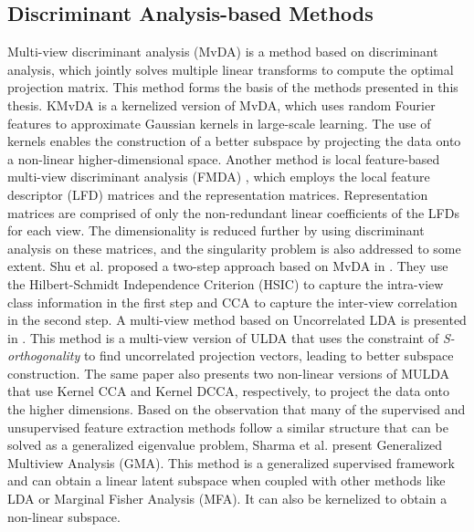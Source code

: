 \subsection{Discriminant Analysis-based Methods}
\label{subs:Lit_Mv_DA}
Multi-view discriminant analysis (MvDA) \cite{KanSZLC16} is a method based on discriminant analysis, which jointly solves multiple linear transforms to compute the optimal projection matrix. This method forms the basis of the methods presented in this thesis. KMvDA \cite{LiGL20} is a kernelized version of MvDA, which uses random Fourier features to approximate Gaussian kernels in large-scale learning. The use of kernels enables the construction of a better subspace by projecting the data onto a non-linear higher-dimensional space. Another method is local feature-based multi-view discriminant analysis (FMDA) \cite{HuPGZ18}, which employs the local feature descriptor (LFD) matrices and the representation matrices. Representation matrices are comprised of only the non-redundant linear coefficients of the LFDs for each view. The dimensionality is reduced further by using discriminant analysis on these matrices, and the singularity problem is also addressed to some extent. Shu et al. proposed a two-step approach based on MvDA in \cite{ShuYJL19}. They use the Hilbert-Schmidt Independence Criterion (HSIC) to capture the intra-view class information in the first step and CCA to capture the inter-view correlation in the second step. A multi-view method based on Uncorrelated LDA is presented in \cite{SunXY15}. This method is a multi-view version of ULDA that uses the constraint of \textit{S-orthogonality} to find uncorrelated projection vectors, leading to better subspace construction. The same paper also presents two non-linear versions of MULDA that use Kernel CCA and Kernel DCCA, respectively, to project the data onto the higher dimensions. Based on the observation that many of the supervised and unsupervised feature extraction methods follow a similar structure that can be solved as a generalized eigenvalue problem, Sharma et al. \cite{SharmaKDJ12} present Generalized Multiview Analysis (GMA). This method is a generalized supervised framework and can obtain a linear latent subspace when coupled with other methods like LDA or Marginal Fisher Analysis (MFA). It can also be kernelized to obtain a non-linear subspace.






